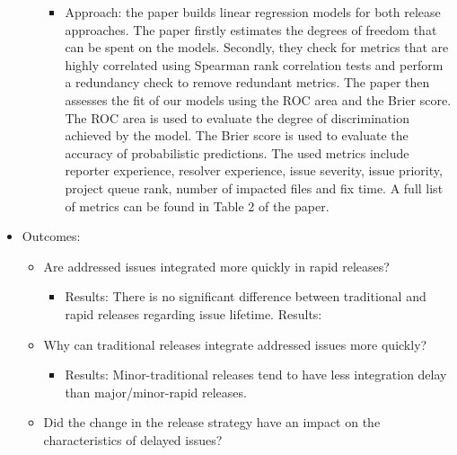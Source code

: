 \documentclass[]{book}
\providecommand{\tightlist}{%
  \setlength{\itemsep}{0pt}\setlength{\parskip}{0pt}}
\begin{document}
\begin{itemize}
\begin{itemize}
    \begin{itemize}
    \tightlist
    \item
      Approach: the paper builds linear regression models for both
      release approaches. The paper firstly estimates the degrees of
      freedom that can be spent on the models. Secondly, they check for
      metrics that are highly correlated using Spearman rank correlation
      tests and perform a redundancy check to remove redundant metrics.
      The paper then assesses the fit of our models using the ROC area
      and the Brier score. The ROC area is used to evaluate the degree
      of discrimination achieved by the model. The Brier score is used
      to evaluate the accuracy of probabilistic predictions. The used
      metrics include reporter experience, resolver experience, issue
      severity, issue priority, project queue rank, number of impacted
      files and fix time. A full list of metrics can be found in Table 2
      of the paper.
    \end{itemize}
  \end{itemize}
\item
  Outcomes:

  \begin{itemize}
  \tightlist
  \item
    Are addressed issues integrated more quickly in rapid releases?

    \begin{itemize}
    \tightlist
    \item
      Results: There is no significant difference between traditional
      and rapid releases regarding issue lifetime. Results:
    \end{itemize}
  \item
    Why can traditional releases integrate addressed issues more
    quickly?

    \begin{itemize}
    \tightlist
    \item
      Results: Minor-traditional releases tend to have less integration
      delay than major/minor-rapid releases.
    \end{itemize}
  \item
    Did the change in the release strategy have an impact on the
    characteristics of delayed issues?


\end{itemize}
\end{itemize}
\end{document}
